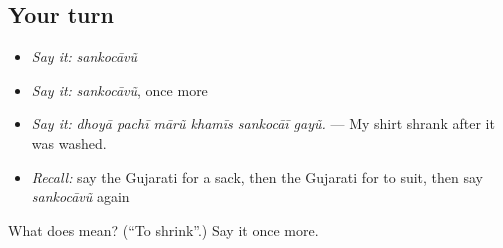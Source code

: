 \subsection*{Your turn}
\begin{itemize}
\raggedright
  \item \emph{Say it:} \emph{sankocāvũ}
  \item \emph{Say it:} \emph{sankocāvũ}, once more
  \item \emph{Say it:} \emph{dhoyā pachī mārũ khamīs sankocāī gayũ.} — My shirt shrank after it was washed.
  \item \emph{Recall:} say the Gujarati for a sack, then the Gujarati for to suit, then say \emph{sankocāvũ} again
\end{itemize}

\begin{tcolorbox}[breakable,colback=teal!4,colframe=teal!35!black,title={Before you move on}]
What does  mean? (\textquotedblleft{}To shrink\textquotedblright{}.) Say it once more.
\end{tcolorbox}
